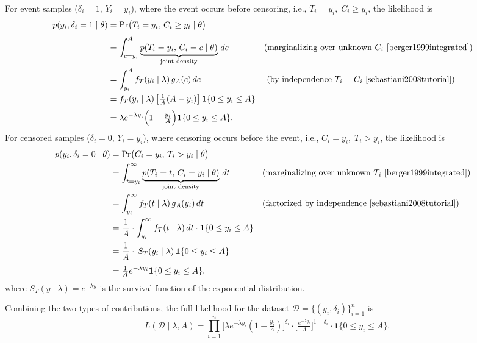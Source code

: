 For event samples ($\delta_i=1,\, Y_i=y_i$), where the event occurs before censoring, i.e., $T_i = y_i,\; C_i \ge y_i$, the likelihood is
{\footnotesize
\begin{align}
p(y_i,\delta_i=1\mid\theta)
 &= \Pr\bigl(T_i=y_i,\,C_i\ge y_i \mid \theta\bigr) \\[3pt]
 &= \int_{c=y_i}^{A} \underbrace{p(T_i=y_i,\,C_i=c \mid \theta)}_{\text{joint density}}\,dc 
    &&\text{(marginalizing over unknown $C_i$~\cite{berger1999integrated})}\\
 &= \int_{y_i}^{A} f_T(y_i\mid\lambda)\,g_A(c)\,dc 
    && \text{ (by independence }T_i\perp C_i~\cite{sebastiani2008tutorial})\\
 &= f_T(y_i\mid\lambda)\,
    \bigl[\tfrac1A(A-y_i)\bigr]\,
    \mathbf 1\{0\le y_i\le A\}\\[3pt]
 &= \lambda e^{-\lambda y_i}\Bigl(1-\tfrac{y_i}{A}\Bigr)
    \mathbf 1\{0\le y_i\le A\}.
\end{align}}
For censored samples ($\delta_i=0,\, Y_i=y_i$), where censoring occurs before the event, i.e., $C_i = y_i,\; T_i > y_i$, the likelihood is
{\footnotesize
\begin{align}
p(y_i,\delta_i=0\mid\theta)
 &= \Pr\bigl(C_i=y_i,\,T_i>y_i \mid \theta\bigr) \\[0pt]
 &= \int_{t=y_i}^{\infty} 
    \underbrace{p(T_i=t,\,C_i=y_i \mid \theta)}_{\text{joint density}}\,dt
    &&\text{(marginalizing over unknown }T_i~\cite{berger1999integrated})\\[0pt]
 &= \int_{y_i}^{\infty} f_T(t\mid\lambda)\,g_A(y_i)\,dt
    &&\text{(factorized by independence~\cite{sebastiani2008tutorial})}\\[0pt]
 &= \frac{1}{A} \cdot \int_{y_i}^{\infty} f_T(t \mid \lambda) \, dt \cdot \mathbf{1}\{0 \le y_i \le A\} \\
 &= \frac{1}{A}\cdot \,S_T(y_i\mid\lambda)\,
    \mathbf 1\{0\le y_i\le A\}\\[3pt]
 &= \tfrac1A e^{-\lambda y_i}\mathbf 1\{0\le y_i\le A\},
\end{align}}
where $S_T(y\mid\lambda)=e^{-\lambda y}$ is the survival function of the exponential distribution.

Combining the two types of contributions, the full likelihood for the dataset $\mathcal{D} = \{(y_i, \delta_i)\}_{i=1}^n$ is
\begin{equation}
L(\mathcal{D}\mid\lambda,A)=
\prod_{i=1}^n
\bigl[\lambda e^{-\lambda y_i}(1-\tfrac{y_i}{A})\bigr]^{\delta_i}
\cdot \bigl[\tfrac{e^{-\lambda y_i}}{A}\bigr]^{1-\delta_i}
\cdot \mathbf 1\{0\le y_i \le A\}.
\label{A_likeli}
\end{equation}

